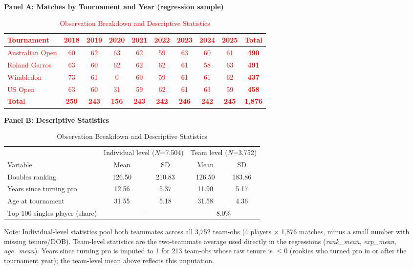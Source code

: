 \documentclass[10pt]{article}
\begin{document}
\begin{table}[htbp]
\color{blue}
\centering
\caption{Observation Breakdown and Descriptive Statistics}
\label{tab:t1}
\begin{threeparttable}
\textbf{Panel A: Matches by Tournament and Year (regression sample)}\\[2pt]
\textcolor{red}{
\begin{tabular}{lccccccccc}
\toprule
Tournament & 2018 & 2019 & 2020 & 2021 & 2022 & 2023 & 2024 & 2025 & \textbf{Total} \\
\midrule
Australian Open & 60 & 62 & 63 & 62 & 59 & 63 & 60 & 61 & \textbf{490} \\
Roland Garros    & 63 & 60 & 62 & 62 & 62 & 61 & 58 & 63 & \textbf{491} \\
Wimbledon        & 73 & 61 & 0  & 60 & 59 & 61 & 61 & 62 & \textbf{437} \\
US Open          & 63 & 60 & 31 & 59 & 62 & 61 & 63 & 59 & \textbf{458} \\
\midrule
\textbf{Total} & \textbf{259} & \textbf{243} & \textbf{156} & \textbf{243} & \textbf{242} & \textbf{246} & \textbf{242} & \textbf{245} & \textbf{1,876} \\
\bottomrule
\end{tabular}
}

\vspace{10pt}
\textbf{Panel B: Descriptive Statistics}\\[2pt]
\begin{tabular}{lcccc}
\toprule
 & \multicolumn{2}{c}{Individual level ($N$=7,504)} & \multicolumn{2}{c}{Team level ($N$=3,752)} \\
Variable & Mean & SD & Mean & SD \\
\midrule
Doubles ranking            & 126.50 & 210.83 & 126.50 & 183.86 \\
Years since turning pro    & 12.56  & 5.37   & 11.90  & 5.17   \\
Age at tournament          & 31.55  & 5.18   & 31.58  & 4.36   \\
Top-100 singles player (share) & \multicolumn{2}{c}{--} & \multicolumn{2}{c}{8.0\%} \\
\bottomrule
\end{tabular}
\begin{tablenotes}
\small
\item Note: Individual-level statistics pool both teammates across all 3,752 team-obs (4 players $\times$ 1,876 matches, minus a small number with missing tenure/DOB). Team-level statistics are the two-teammate average used directly in the regressions (\textit{rank\_mean}, \textit{exp\_mean}, \textit{age\_mean}). Years since turning pro is imputed to 1 for 213 team-obs whose raw tenure is $\le 0$ (rookies who turned pro in or after the tournament year); the team-level mean above reflects this imputation.
\end{tablenotes}
\end{threeparttable}
\end{table}
\end{document}
